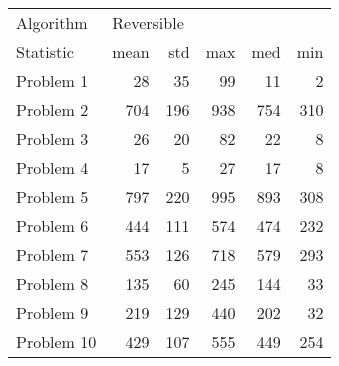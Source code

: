 \begin{tabular}{lrrrrr}
\toprule
Algorithm & \multicolumn{5}{l}{Reversible} \\
Statistic &       mean &  std &  max &  med &  min \\
\midrule
Problem 1  &         28 &   35 &   99 &   11 &    2 \\
Problem 2  &        704 &  196 &  938 &  754 &  310 \\
Problem 3  &         26 &   20 &   82 &   22 &    8 \\
Problem 4  &         17 &    5 &   27 &   17 &    8 \\
Problem 5  &        797 &  220 &  995 &  893 &  308 \\
Problem 6  &        444 &  111 &  574 &  474 &  232 \\
Problem 7  &        553 &  126 &  718 &  579 &  293 \\
Problem 8  &        135 &   60 &  245 &  144 &   33 \\
Problem 9  &        219 &  129 &  440 &  202 &   32 \\
Problem 10 &        429 &  107 &  555 &  449 &  254 \\
\bottomrule
\end{tabular}
